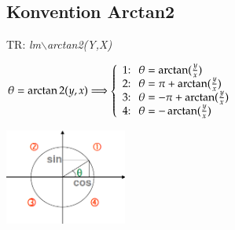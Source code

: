 \enlargethispage{1cm}
\subsection{Konvention Arctan2 }
TR: \textit{lm$\backslash$arctan2(Y,X)}

	\begin{minipage}{10cm}
    	$\theta=\arctan2(y,x)\Longrightarrow\left\{
    	\begin{array}{l}
            \text{1:\space\space}\theta=\arctan(\frac{y}{x})\\
			\text{2:\space\space}\theta=\pi+\arctan(\frac{y}{x})\\
			\text{3:\space\space}\theta=-\pi+\arctan(\frac{y}{x})\\
			\text{4:\space\space}\theta=-\arctan(\frac{y}{x})\\
		\end{array}\right.$
    \end{minipage}
	\begin{minipage}{10cm}
    \includegraphics[width=4cm]{./bilder/einheitskreis.png}
    \end{minipage}

